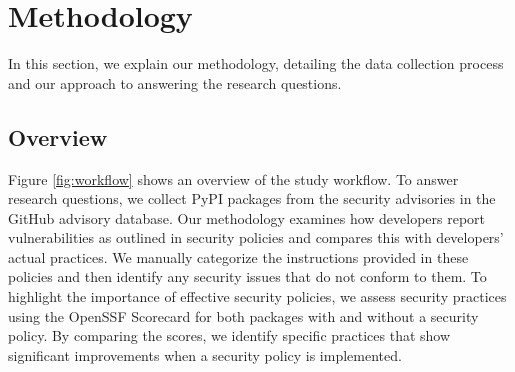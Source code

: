 \section{Methodology}
\label{3_methodology}
In this section, we explain our methodology, detailing the data collection process and our approach to answering the research questions.

\subsection{Overview}
Figure \ref{fig:workflow} shows an overview of the study workflow. To answer research questions, we collect PyPI packages from the security advisories in the GitHub advisory database. Our methodology examines how developers report vulnerabilities as outlined in security policies and compares this with developers' actual practices. We manually categorize the instructions provided in these policies and then identify any security issues that do not conform to them. To highlight the importance of effective security policies, we assess security practices using the OpenSSF Scorecard for both packages with and without a security policy. By comparing the scores, we identify specific practices that show significant improvements when a security policy is implemented.







